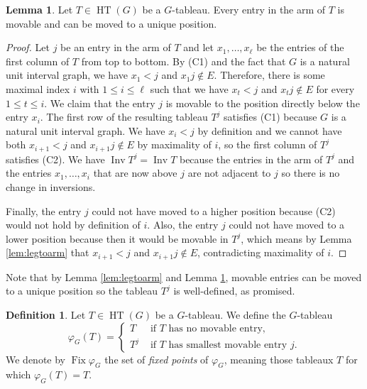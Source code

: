 \documentclass[12pt]{amsart}  %
\theoremstyle{definition}
\newtheorem{lemma}[theorem]{Lemma}
\newtheorem{definition}[theorem]{Definition}
\theoremstyle{remark}
\numberwithin{equation}{section}
\DeclareMathOperator{\Inv}{Inv}
\DeclareMathOperator{\Fix}{Fix}
\DeclareMathOperator{\HT}{HT}
\begin{document}
\begin{lemma} \label{lem:armtoleg}
Let $T\in\HT(G)$ be a $G$-tableau. Every entry in the arm of $T$ is movable and can be moved to a unique position.
\end{lemma}

\begin{proof}
Let $j$ be an entry in the arm of $T$ and let $x_1,\ldots,x_\ell$ be the entries of the first column of $T$ from top to bottom. By (C1) and the fact that $G$ is a natural unit interval graph, we have $x_1<j$ and $x_1j\notin E$. Therefore, there is some maximal index $i$ with $1\leq i\leq \ell$ such that we have $x_t<j$ and $x_tj\notin E$ for every $1\leq t\leq i$. We claim that the entry $j$ is movable to the position directly below the entry $x_i$. The first row of the resulting tableau $T^j$ satisfies (C1) because $G$ is a natural unit interval graph. We have $x_i<j$ by definition and we cannot have both $x_{i+1}<j$ and $x_{i+1}j\notin E$ by maximality of $i$, so the first column of $T^j$ satisfies (C2). We have $\Inv T^j=\Inv T$ because the entries in the arm of $T^j$ and the entries $x_1,\ldots,x_i$ that are now above $j$ are not adjacent to $j$ so there is no change in inversions. 

Finally, the entry $j$ could not have moved to a higher position because (C2) would not hold by definition of $i$. Also, the entry $j$ could not have moved to a lower position because then it would be movable in $T^j$, which means by Lemma \ref{lem:legtoarm} that $x_{i+1}<j$ and $x_{i+1}j\notin E$, contradicting maximality of $i$.
\end{proof}

Note that by Lemma \ref{lem:legtoarm} and Lemma \ref{lem:armtoleg}, movable entries can be moved to a unique position so the tableau $T^j$ is well-defined, as promised.

\begin{definition}
Let $T\in\HT(G)$ be a $G$-tableau. We define the $G$-tableau
\begin{equation}
\varphi_G(T)=\begin{cases} T&\text{ if }T\text{ has no movable entry,}\\ T^j&\text{ if }T\text{ has smallest movable entry }j.\end{cases}
\end{equation}
We denote by $\Fix\varphi_G$ the set of \emph{fixed points} of $\varphi_G$, meaning those tableaux $T$ for which $\varphi_G(T)=T$.
\end{definition}
\end{document}
